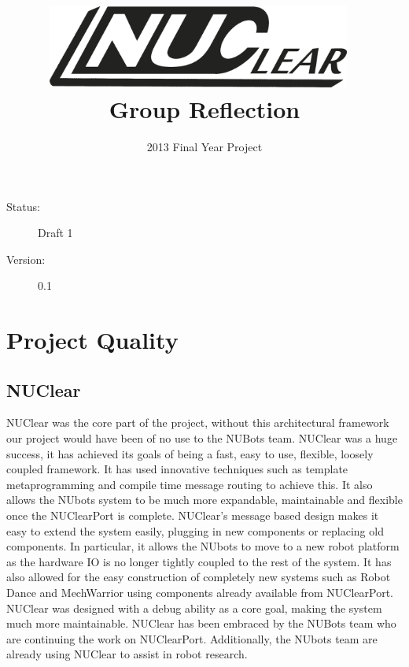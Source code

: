 \documentclass[english,12pt]{scrartcl}
\title{\includegraphics[width=0.75\textwidth]{./Logo/NUClear-logo}~\\[1cm] Group Reflection}
\author{2013 Final Year Project}
\begin{document}
	\maketitle
	\vfill
	{\large
		\begin{description}
			\item [Status:] Draft 1
			\item [Version:] 0.1
		\end{description}}

	\clearpage
	\tableofcontents
		
	\clearpage

\section{Project Quality}
	\subsection{NUClear}
		NUClear was the core part of the project, without this architectural framework our project would have been of no use to the NUBots team.
		NUClear was a huge success, it has achieved its goals of being a fast, easy to use, flexible, loosely coupled framework.
		It has used innovative techniques such as template metaprogramming and compile time message routing to achieve this.
		It also allows the NUbots system to be much more expandable, maintainable and flexible once the NUClearPort is complete.
		NUClear’s message based design makes it easy to extend the system easily, plugging in new components or replacing old components.
		In particular, it allows the NUbots to move to a new robot platform as the hardware IO is no longer tightly coupled to the rest of the system.
		It has also allowed for the easy construction of completely new systems such as Robot Dance and MechWarrior using components already available from NUClearPort.
		NUClear was designed with a debug ability as a core goal, making the system much more maintainable. NUClear has been embraced by the NUBots team who are continuing the work on NUClearPort.
		Additionally, the NUbots team are already using NUClear to assist in robot research.
	
\end{document}
